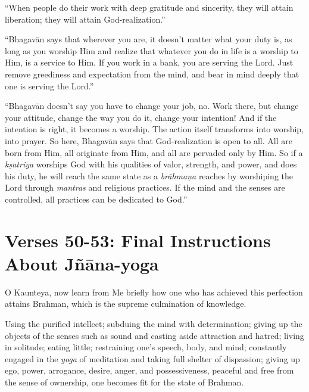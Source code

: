 \enquote{When people do their work with deep gratitude and sincerity, they will attain liberation; they will attain God-realization.}

\enquote{Bhagavān says that wherever you are, it doesn’t matter what your duty is, as long as you worship Him and realize that whatever you do in life is a worship to Him, is a service to Him. If you work in a bank, you are serving the Lord. Just remove greediness and expectation from the mind, and bear in mind deeply that one is serving the Lord.}

\enquote{Bhagavān doesn’t say you have to change your job, no. Work there, but change your attitude, change the way you do it, change your intention! And if the intention is right, it becomes a worship. The action itself transforms into worship, into prayer. So here, Bhagavān says that God-realization is open to all. All are born from Him, all originate from Him, and all are pervaded only by Him. So if a \textit{kṣatriya} worships God with his qualities of valor, strength, and power, and does his duty, he will reach the same state as a \textit{brāhmaṇa} reaches by worshiping the Lord through \textit{mantras} and religious practices. If the mind and the senses are controlled, all practices can be dedicated to God.}

\newpage
\section{Verses 50-53: Final Instructions About Jñāna-yoga}\label{sec-verses-50-53-final-instructions-about-jnana-yoga}

{O Kaunteya, now learn from Me briefly how one who has achieved this perfection attains Brahman, which is the supreme culmination of knowledge.}

{Using the purified intellect; subduing the mind with determination; giving up the objects of the senses such as sound and casting aside attraction and hatred; living in solitude; eating little; restraining one's speech, body, and mind; constantly engaged in the \textit{yoga} of meditation and taking full shelter of dispassion; giving up ego, power, arrogance, desire, anger, and possessiveness, peaceful and free from the sense of ownership, one becomes fit for the state of Brahman.}

